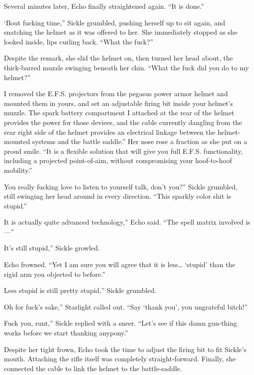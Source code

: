Several minutes later, Echo finally straightened again. “It is done.”

\leavevmode{}‘Bout fucking time,” Sickle grumbled, pushing herself up to sit again, and snatching the helmet as it was offered to her. She immediately stopped as she looked inside, lips curling back. “What the fuck?”

Despite the remark, she slid the helmet on, then turned her head about, the thick-barred muzzle swinging beneath her chin. “What the fuck did you do to my helmet?”

\leavevmode{}I removed the E.F.S. projectors from the pegasus power armor helmet and mounted them in yours, and set an adjustable firing bit inside your helmet’s muzzle. The spark battery compartment I attached at the rear of the helmet provides the power for those devices, and the cable currently dangling from the rear right side of the helmet provides an electrical linkage between the helmet-mounted systems and the battle saddle.” Her nose rose a fraction as she put on a proud smile. “It is a flexible solution that will give you full E.F.S. functionality, including a projected point-of-aim, without compromising your hoof-to-hoof mobility.”

\leavevmode{}You really fucking love to listen to yourself talk, don’t you?” Sickle grumbled, still swinging her head around in every direction. “This sparkly color shit is stupid.”

\leavevmode{}It is actually quite advanced technology,” Echo said. “The spell matrix involved is—”

\leavevmode{}It’s still stupid,” Sickle growled.

Echo frowned. “Yet I am sure you will agree that it is less… ‘stupid’ than the rigid arm you objected to before.”

\leavevmode{}Less stupid is still pretty stupid,” Sickle grumbled.

\leavevmode{}Oh for fuck’s sake,” Starlight called out. “Say ‘thank you’, you ungrateful bitch!”

\leavevmode{}Fuck you, runt,” Sickle replied with a sneer. “Let’s see if this damn gun-thing works before we start thanking anypony.”

Despite her tight frown, Echo took the time to adjust the firing bit to fit Sickle’s mouth. Attaching the rifle itself was completely straight-forward. Finally, she connected the cable to link the helmet to the battle-saddle.

